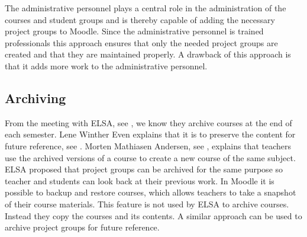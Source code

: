 The administrative personnel plays a central role in the administration of the courses and student groups and is thereby capable of adding the necessary project groups to Moodle. 
Since the administrative personnel is trained professionals this approach ensures that only the needed project groups are created and that they are maintained properly. 
A drawback of this approach is that it adds more work to the administrative personnel. 


\subsection{Archiving}
\label{sub:analysarchiving}
From the meeting with ELSA, see , we know they archive courses at the end of each semester. 
Lene Winther Even explains that it is to preserve the content for future reference, see . 
Morten Mathiasen Andersen, see , explains that teachers use the archived versions of a course to create a new course of the same subject. 
ELSA proposed that project groups can be archived for the same purpose so teacher and students can look back at their previous work.
In Moodle it is possible to backup and restore courses, which allows teachers to take a snapshot of their course materials. 
This feature is not used by ELSA to archive courses.
Instead they copy the courses and its contents.
A similar approach can be used to archive project groups for future reference. 

